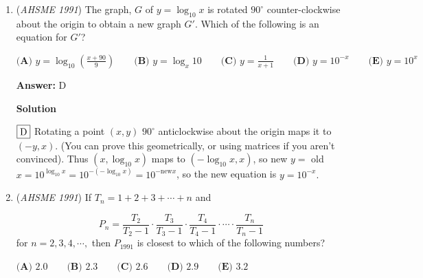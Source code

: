 \begin{enumerate}
 $\textbf{(A) } \frac{1}{3}\qquad \textbf{(B) } \frac{2}{5}\qquad \textbf{(C) } \frac{7}{15}\qquad \textbf{(D) } \frac{8}{15}\qquad \textbf{(E) } \frac{3}{5}$

 \textbf{Answer: }C



\textbf{Solution 1: Coordinate Geometry}

Solution by you\_r\_gassy

 
First, we find out the coordinates of the vertices of quadrilateral $BEIH$, then use the Shoelace Theorem to solve for the area. Denote $B$ as $(0,0)$. Then $E (0,1)$. Since I is the intersection between lines $DE$ and $AF$, and since the equations of those lines are $y = \dfrac{1}{2}x + 1$ and $y = -2x + 2$, $I (\dfrac{2}{5}, \dfrac{6}{5})$. Using the same method, the equation of line $BD$ is $y = x$, so $H (\dfrac{2}{3}, \dfrac{2}{3})$. Using the Shoelace Theorem, the area of $BEIH$ is $\dfrac{1}{2}\cdot\dfrac{14}{15} = \boxed{\textbf{(C) } \dfrac{7}{15}}$.

 


	\item (\textit{AHSME 1991}) The graph, $G$ of $y=\log_{10}x$ is rotated $90^{\circ}$ counter-clockwise about the origin to obtain a new graph $G'$. Which of the following is an equation for $G'$?


 $\textbf{(A) } y=\log_{10}\left(\frac{x+90}{9}\right) \qquad \textbf{(B) } y=\log_{x}10 \qquad \textbf{(C) } y=\frac{1}{x+1} \qquad \textbf{(D) } y=10^{-x} \qquad \textbf{(E) } y=10^x$

 \textbf{Answer: }D



\textbf{Solution}

$\fbox{D}$ Rotating a point $(x,y)$ $90^{\circ}$ anticlockwise about the origin maps it to $(-y,x).$ (You can prove this geometrically, or using matrices if you aren't convinced). Thus $(x, \log_{10}x)$ maps to $(-\log_{10}x, x)$, so new $y =$ old $x = 10^{\log_{10}x} = 10^{-(-\log_{10}x)} = 10^{-\text{new} x}$, so the new equation is $y=10^{-x}.$



	\item (\textit{AHSME 1991}) If $T_n=1+2+3+\cdots +n$ and

 \[P_n=\frac{T_2}{T_2-1}\cdot\frac{T_3}{T_3-1}\cdot\frac{T_4}{T_4-1}\cdot\cdots\cdot\frac{T_n}{T_n-1}\]
for $n=2,3,4,\cdots,$ then $P_{1991}$ is closest to which of the following numbers?


 $\textbf{(A) } 2.0\qquad \textbf{(B) } 2.3\qquad \textbf{(C) } 2.6\qquad \textbf{(D) } 2.9\qquad \textbf{(E) } 3.2$


\end{enumerate}
